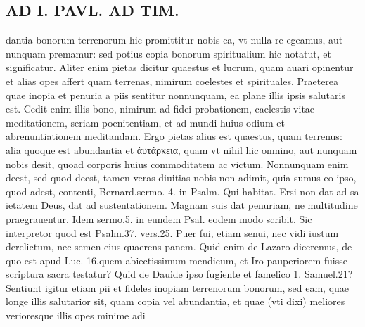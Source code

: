 \documentclass{article}
\begin{document}
\begin{pages}
\section*{AD I. PAVL. AD TIM. }
\marginpar{[ p.430 ]}\pstart dantia bonorum terrenorum hic promittitur nobis ea, vt nulla re egeamus, aut nunquam premamur: sed potius copia bonorum spiritualium hic notatut, et significatur. Aliter enim pietas dicitur quaestus et lucrum, quam auari opinentur et alias opes affert quam terrenas, nimirum coelestes et spirituales. Praeterea quae inopia et penuria a piis sentitur nonnunquam, ea plane illis ipsis salutaris est. Cedit enim illis bono, nimirum ad fidei probationem, caelestis vitae meditationem, seriam poenitentiam, et ad mundi huius odium et abrenuntiationem meditandam. Ergo pietas alius est quaestus, quam terrenus: alia quoque est abundantia et ἀυτάρκεια, quam vt nihil hic omnino, aut nunquam nobis desit, quoad corporis huius commoditatem ac victum. Nonnunquam enim deest, sed quod deest, tamen veras diuitias nobis non adimit, quia sumus eo ipso, quod adest, contenti, Bernard.sermo. 4. in Psalm. Qui habitat. Ersi non dat ad sa ietatem Deus, dat ad sustentationem. Magnam suis dat penuriam, ne multitudine praegrauentur. Idem sermo.5. in eundem Psal. eodem modo scribit. Sic interpretor quod est Psalm.37. vers.25. Puer fui, etiam senui, nec vidi iustum derelictum, nec semen eius quaerens panem. Quid enim de Lazaro diceremus, de quo est apud Luc. 16.quem abiectissimum mendicum, et Iro pauperiorem fuisse scriptura sacra testatur? Quid de Dauide ipso fugiente et famelico 1. Samuel.21? Sentiunt igitur etiam pii et fideles inopiam terrenorum bonorum, sed eam, quae longe illis salutarior sit, quam copia vel abundantia, et quae (vti dixi) meliores verioresque illis opes minime adi\pend

\end{pages}
\end{document}
